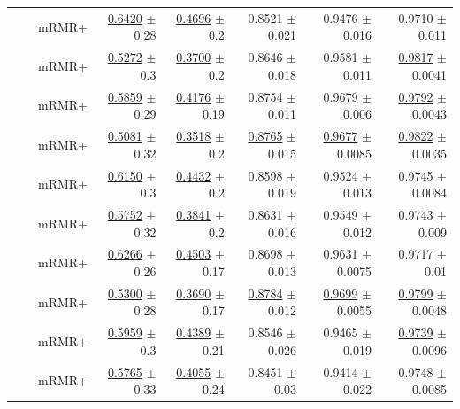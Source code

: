 \begin{longtable}{llp{}rrrrr}
 &  & mRMR+ & \underline{0.6420} {\scriptsize $\pm$ 0.28} & \underline{0.4696} {\scriptsize $\pm$ 0.2} & 0.8521 {\scriptsize $\pm$ 0.021} & 0.9476 {\scriptsize $\pm$ 0.016} & 0.9710 {\scriptsize $\pm$ 0.011} \\
 &  & mRMR+ & \underline{0.5272} {\scriptsize $\pm$ 0.3} & \underline{0.3700} {\scriptsize $\pm$ 0.2} & 0.8646 {\scriptsize $\pm$ 0.018} & 0.9581 {\scriptsize $\pm$ 0.011} & \underline{0.9817} {\scriptsize $\pm$ 0.0041} \\
 &  & mRMR+ & \underline{0.5859} {\scriptsize $\pm$ 0.29} & \underline{0.4176} {\scriptsize $\pm$ 0.19} & 0.8754 {\scriptsize $\pm$ 0.011} & 0.9679 {\scriptsize $\pm$ 0.006} & \underline{0.9792} {\scriptsize $\pm$ 0.0043} \\
 &  & mRMR+ & \underline{0.5081} {\scriptsize $\pm$ 0.32} & \underline{0.3518} {\scriptsize $\pm$ 0.2} & \underline{0.8765} {\scriptsize $\pm$ 0.015} & \underline{0.9677} {\scriptsize $\pm$ 0.0085} & \underline{0.9822} {\scriptsize $\pm$ 0.0035} \\
 &  & mRMR+ & \underline{0.6150} {\scriptsize $\pm$ 0.3} & \underline{0.4432} {\scriptsize $\pm$ 0.2} & 0.8598 {\scriptsize $\pm$ 0.019} & 0.9524 {\scriptsize $\pm$ 0.013} & 0.9745 {\scriptsize $\pm$ 0.0084} \\
 &  & mRMR+ & \underline{0.5752} {\scriptsize $\pm$ 0.32} & \underline{0.3841} {\scriptsize $\pm$ 0.2} & 0.8631 {\scriptsize $\pm$ 0.016} & 0.9549 {\scriptsize $\pm$ 0.012} & 0.9743 {\scriptsize $\pm$ 0.009} \\
 &  & mRMR+ & \underline{0.6266} {\scriptsize $\pm$ 0.26} & \underline{0.4503} {\scriptsize $\pm$ 0.17} & 0.8698 {\scriptsize $\pm$ 0.013} & 0.9631 {\scriptsize $\pm$ 0.0075} & 0.9717 {\scriptsize $\pm$ 0.01} \\
 &  & mRMR+ & \underline{0.5300} {\scriptsize $\pm$ 0.28} & \underline{0.3690} {\scriptsize $\pm$ 0.17} & \underline{0.8784} {\scriptsize $\pm$ 0.012} & \underline{0.9699} {\scriptsize $\pm$ 0.0055} & \underline{0.9799} {\scriptsize $\pm$ 0.0048} \\
 &  & mRMR+ & \underline{0.5959} {\scriptsize $\pm$ 0.3} & \underline{0.4389} {\scriptsize $\pm$ 0.21} & 0.8546 {\scriptsize $\pm$ 0.026} & 0.9465 {\scriptsize $\pm$ 0.019} & \underline{0.9739} {\scriptsize $\pm$ 0.0096} \\
 &  & mRMR+ & \underline{0.5765} {\scriptsize $\pm$ 0.33} & \underline{0.4055} {\scriptsize $\pm$ 0.24} & 0.8451 {\scriptsize $\pm$ 0.03} & 0.9414 {\scriptsize $\pm$ 0.022} & 0.9748 {\scriptsize $\pm$ 0.0085} \\

\end{longtable}
